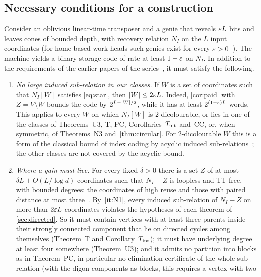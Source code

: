 \subsection{Necessary conditions for a construction}\label{sec:con-necessary}

Consider an oblivious linear-time transposer and a genie that reveals $\varepsilon L$ bits and leaves cones of bounded depth,
with recovery relation $N_I$ on the $L$ input coordinates (for home-based work heads such genies exist for every
$\varepsilon>0$~\cite[Theorem~4.20 and Corollary~4.23]{FourthPaper2026}). The machine yields a binary storage code of rate at least $1-\varepsilon$ on
$N_I$. In addition to the requirements of the earlier papers of the series~\cite{FirstPaper2026,SecondPaper2026,FourthPaper2026,DirectedRecovery2026},
it must satisfy the following.
\begin{enumerate}[label=(N\arabic*),leftmargin=3em]
\item\label{it:N1} \emph{No large induced sub-relation in our classes.} If $W$ is a set of coordinates such that
$N_I[W]$ satisfies \eqref{eq:star}, then $\lvert W \rvert\le2\varepsilon L$. Indeed, \cref{cor:paid} with $Z=V\setminus W$ bounds the
code by $2^{L-\lvert W \rvert/2}$, while it has at least $2^{(1-\varepsilon)L}$ words. This applies to every $W$ on which $N_I[W]$ is
$2$-dicolourable, or lies in one of the classes of Theorems~U3, T, PC, Corollaries~$T_{\mathrm{int}}$ and~CC, or, when symmetric, of
Theorems~N3 and~\ref{thm:circular}. For $2$-dicolourable $W$ this is a form of the classical bound of index coding by
acyclic induced sub-relations~\cite{BBJK2011}; the other classes are not covered by the acyclic bound.
\item\label{it:N2} \emph{Where a gain must live.} For every fixed $\delta>0$ there is a set $Z$ of at most
$\delta L+O(L/\log d)$ coordinates such that $N_I-Z$ is loopless and TT-free, with bounded degrees: the coordinates of
high reuse and those with paired distance at most three~\cite[Theorem~3.3 and Corollaries~3.7 and~3.8]{DirectedRecovery2026}.
By~\ref{it:N1}, every induced sub-relation of $N_I-Z$ on more than $2\varepsilon L$ coordinates violates the hypotheses of each
theorem of \cref{sec:directed}. So it must contain vertices with at least three parents inside their strongly connected
component that lie on directed cycles among themselves (Theorem~T and Corollary~$T_{\mathrm{int}}$); it must have underlying degree
at least four somewhere (Theorem~U3); and it admits no partition into blocks as in Theorem~PC, in particular no
elimination certificate of the whole sub-relation (with the digon components as blocks, this requires a vertex with two

\end{enumerate}
